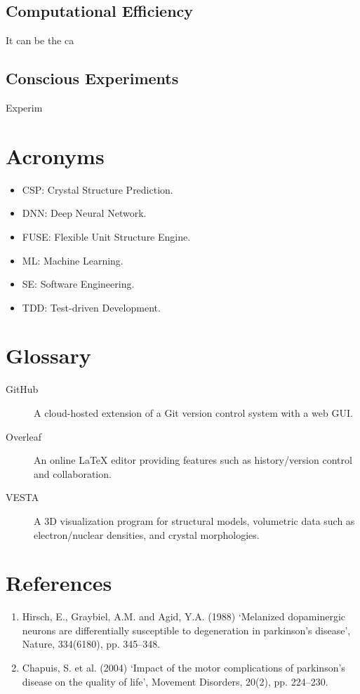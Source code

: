 \documentclass[12pt]{article}
\begin{document}
\subsection{Computational Efficiency}
It can be the ca

\subsection{Conscious Experiments}
Experim

\section*{Acronyms}
\begin{itemize}
    \item CSP: Crystal Structure Prediction.
    \item DNN: Deep Neural Network.
    \item FUSE: Flexible Unit Structure Engine.
    \item ML: Machine Learning.
    \item SE: Software Engineering.
    \item TDD: Test-driven Development.
\end{itemize}

\section*{Glossary}
\begin{description}
    \item[GitHub] A cloud-hosted extension of a Git version control system with a web GUI.
    \item[Overleaf] An online LaTeX editor providing features such as history/version control and collaboration.
    \item[VESTA] A 3D visualization program for structural models, volumetric data such as electron/nuclear densities, and crystal morphologies.
\end{description}

\section*{References}
\begin{enumerate}
	\item Hirsch, E., Graybiel, A.M. and Agid, Y.A. (1988) ‘Melanized dopaminergic neurons are differentially susceptible to degeneration in parkinson’s disease’, Nature, 334(6180), pp. 345–348.

	\item Chapuis, S. et al. (2004) ‘Impact of the motor complications of parkinson’s disease on the quality of life’, Movement Disorders, 20(2), pp. 224–230.


\end{enumerate}
\end{document}
